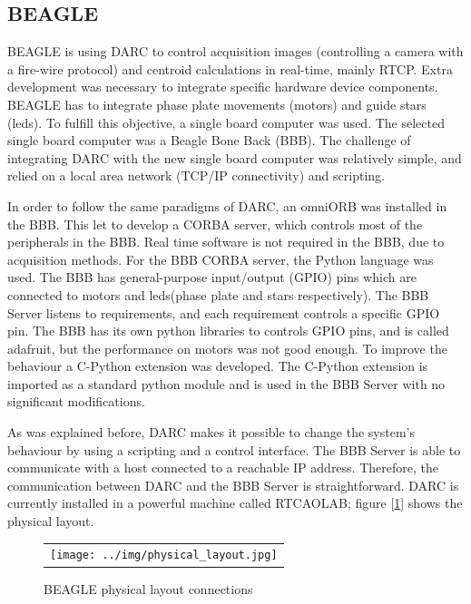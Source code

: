 \documentclass[]{spie}  %
\begin{document}
\subsection{BEAGLE}
BEAGLE is using DARC to control acquisition images (controlling a camera with
a fire-wire protocol) and centroid calculations in real-time, mainly RTCP.
Extra development was necessary to integrate specific hardware device components.
BEAGLE has to integrate phase plate movements (motors) and guide stars
(leds). To fulfill this objective, a single board computer was used. The selected
single board computer was a Beagle Bone Back (BBB).  The challenge of
integrating DARC with the new single board computer was relatively simple, and
relied on a local area network (TCP/IP connectivity) and scripting.  

 In order to follow the same paradigms of DARC, an omniORB was installed in
 the BBB. This let to develop a CORBA server, which controls most of the
 peripherals in the BBB. Real time software is not required in the BBB, due to
 acquisition methods.  For the BBB CORBA server, the Python language was used.
 The BBB has general-purpose input/output (GPIO) pins which are connected to
 motors and leds(phase plate and stars respectively). The BBB Server listens to
 requirements, and each requirement controls a specific GPIO pin. The BBB has
 its own python    libraries to controls GPIO pins, and is called adafruit, but
 the    performance on motors  was not good enough.   To improve the behaviour
 a    C-Python extension was developed. The C-Python extension is imported as a
 standard python module and is used in the BBB Server with no significant
 modifications.

As was explained before, DARC makes it possible to change the system's behaviour
by using a scripting and a control interface. The BBB Server is able to communicate with
a host connected to a reachable IP address. Therefore, the communication
between DARC and the BBB Server is straightforward. DARC is currently installed in a
powerful machine called RTCAOLAB; figure [\ref{fig:phy_lay}] shows the physical
layout. 

   \begin{figure}[!ht]
   \begin{center}
   \begin{tabular}{c}
   \texttt{[image: ../img/physical\_layout.jpg]}
   \end{tabular}
   \end{center}
   \caption[phy] 
   { \label{fig:phy_lay} BEAGLE physical layout connections}
   \end{figure} 
\end{document}
